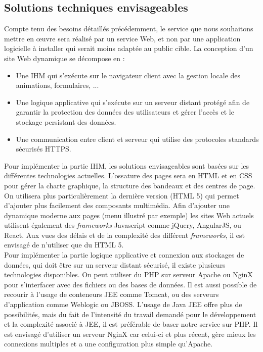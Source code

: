 \documentclass[a4paper,11pt]{article}
\begin{document}
\subsection{Solutions techniques envisageables}

Compte tenu des besoins détaillés précédemment, le service que nous souhaitons mettre en œuvre
sera réalisé par un service Web, et non par une application logicielle à installer qui serait moins
adaptée au public cible. La conception d’un site Web dynamique se décompose en : \\

\begin{itemize}
  \item Une IHM qui s’exécute sur le navigateur client avec la gestion locale des animations, formulaires, ...
  \item Une logique applicative qui s’exécute sur un serveur distant protégé afin de garantir la protection
  des données des utilisateurs et gérer l’accès et le stockage persistant des données.
  \item Une communication entre client et serveur qui utilise des protocoles standards sécurisés HTTPS.
\end{itemize}


Pour implémenter la partie IHM, les solutions envisageables sont basées sur les différentes
technologies actuelles.
L’ossature des pages sera en HTML et en CSS pour gérer la charte graphique, la structure des
bandeaux et des centres de page. On utilisera plus particulièrement la dernière version (HTML 5) qui permet
d’ajouter plus facilement des composants multimédia. Afin d’ajouter une dynamique moderne aux
pages (menu illustré par exemple) les sites Web actuels utilisent également des \textit{frameworks} Javascript
comme jQuery, AngularJS, ou React. Aux vues des délais et de la complexité des différent \textit{frameworks},
il est envisagé de n’utiliser que du HTML 5.\\

Pour implémenter la partie logique applicative et connexion aux stockages de données, qui doit être
sur un serveur distant sécurisé, il existe plusieurs technologies disponibles. On peut utiliser du PHP sur
serveur Apache ou NginX pour s’interfacer avec des fichiers ou des bases de données. Il est aussi possible de
recourir à l’usage de conteneurs JEE comme Tomcat, ou des serveurs d’application comme Weblogic
ou JBOSS. L’usage de Java JEE offre plus de possibilités, mais du fait de l’intensité du travail demandé
pour le développement et la complexité associé à JEE, il est préférable de baser notre service sur PHP.
Il est envisagé d'utiliser un serveur NginX car celui-ci et plus récent, gère mieux les connexions
multiples et a une configuration plus simple qu'Apache.\\
\end{document}
